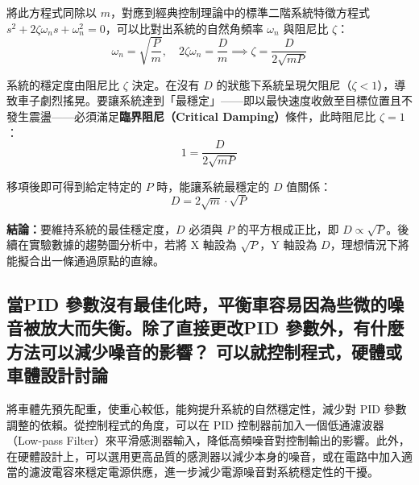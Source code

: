 \documentclass[12pt]{article}
\begin{document}
將此方程式同除以 $m$，對應到經典控制理論中的標準二階系統特徵方程式 $s^2 + 2\zeta\omega_n s + \omega_n^2 = 0$，可以比對出系統的自然角頻率 $\omega_n$ 與阻尼比 $\zeta$：
$$\omega_n = \sqrt{\frac{P}{m}}, \quad 2\zeta\omega_n = \frac{D}{m} \implies \zeta = \frac{D}{2\sqrt{mP}}$$

系統的穩定度由阻尼比 $\zeta$ 決定。在沒有 $D$ 的狀態下系統呈現欠阻尼（$\zeta < 1$），導致車子劇烈搖晃。要讓系統達到「最穩定」——即以最快速度收斂至目標位置且不發生震盪——必須滿足\textbf{臨界阻尼（Critical Damping）}條件，此時阻尼比 $\zeta = 1$：
$$1 = \frac{D}{2\sqrt{mP}}$$

移項後即可得到給定特定的 $P$ 時，能讓系統最穩定的 $D$ 值關係：
$$D = 2\sqrt{m} \cdot \sqrt{P}$$

\textbf{結論：}要維持系統的最佳穩定度，$D$ 必須與 $P$ 的平方根成正比，即 $D \propto \sqrt{P}$。後續在實驗數據的趨勢圖分析中，若將 X 軸設為 $\sqrt{P}$，Y 軸設為 $D$，理想情況下將能擬合出一條通過原點的直線。
\subsection{當PID 參數沒有最佳化時，平衡⾞容易因為些微的噪⾳被放⼤⽽失衡。除了直接更改PID 參數外，有什麼
⽅法可以減少噪⾳的影響？ 可以就控制程式，硬體或⾞體設計討論}
將車體先預先配重，使重心較低，能夠提升系統的自然穩定性，減少對 PID 參數調整的依賴。從控制程式的角度，可以在 PID 控制器前加入一個低通濾波器（Low-pass Filter）來平滑感測器輸入，降低高頻噪音對控制輸出的影響。此外，在硬體設計上，可以選用更高品質的感測器以減少本身的噪音，或在電路中加入適當的濾波電容來穩定電源供應，進一步減少電源噪音對系統穩定性的干擾。
\end{document}
